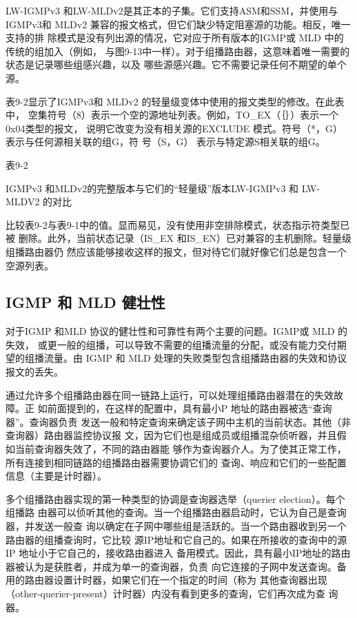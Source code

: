 LW-IGMPv3 和LW-MLDv2是其正本的子集。它们支持ASM和SSM，并使用与
IGMPv3和 MLDv2 兼容的报文格式，但它们缺少特定阻塞源的功能。相反，唯一支持的排
除模式是没有列出源的情况，它对应于所有版本的IGMP或 MLD 中的传统的组加入（例如，
与图9-13中一样）。对于组播路由器，这意味着唯一需要的状态是记录哪些组感兴趣，以及
哪些源感兴趣。它不需要记录任何不期望的单个源。

表9-2显示了IGMPv3和 MLDv2 的轻量级变体中使用的报文类型的修改。在此表中，
空集符号（8）表示一个空的源地址列表。例如，TO\_EX（｛｝）表示一个0x04类型的报文，
说明它改变为没有相关源的EXCLUDE 模式。符号（*，G） 表示与任何源相关联的组G，符
号（S，G） 表示与特定源S相关联的组G。

表9-2

IGMPv3 和MLDv2的完整版本与它们的“轻量级”版本LW-IGMPv3 和 LW-MLDV2 的对比


比较表9-2与表9-1中的值。显而易见，没有使用非空排除模式，状态指示符类型已被
删除。此外，当前状态记录（IS\_EX 和IS\_EN）已对兼容的主机删除。轻量级组播路由器仍
然应该能够接收这样的报文，但对待它们就好像它们总是包含一个空源列表。

\subsection{IGMP 和 MLD 健壮性}
对于IGMP 和MLD 协议的健壮性和可靠性有两个主要的问题。IGMP或 MLD 的失效，
或更一般的组播，可以导致不需要的组播流量的分配，或没有能力交付期望的组播流量。由
IGMP 和 MLD 处理的失败类型包含组播路由器的失效和协议报文的丢失。

通过允许多个组播路由器在同一链路上运行，可以处理组播路由器潜在的失效故障。正
如前面提到的，在这样的配置中，具有最小P 地址的路由器被选“查询器”。查询器负责
发送一般和特定查询来确定该子网中主机的当前状态。其他（非查询器）路由器监控协议报
文，因为它们也是组成员或组播混杂侦听器，并且假如当前查询器失效了，不同的路由器能
够作为查询器介人。为了使其正常工作，所有连接到相同链路的组播路由器需要协调它们的
查询、响应和它们的一些配置信息（主要是计时器）。

多个组播路由器实现的第一种类型的协调是查询器选举（querier election）。每个组播路
由器可以侦听其他的查询。当一个组播路由器启动时，它认为自己是查询器，并发送一般查
询以确定在子网中哪些组是活跃的。当一个路由器收到另一个路由器的组播查询时，它比较
源IP地址和它自己的。如果在所接收的查询中的源IP 地址小于它自己的，接收路由器进入
备用模式。因此，具有最小IP地址的路由器被认为是获胜者，并成为单一的查询器，负责
向它连接的子网中发送查询。备用的路由器设置计时器，如果它们在一个指定的时间（称为
其他查询器出现（other-querier-present）计时器）内没有看到更多的查询，它们再次成为查
询器。

